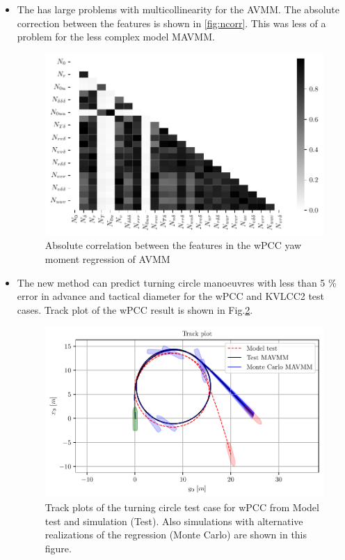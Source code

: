 \begin{itemize}
    \item The  has large problems with multicollinearity for the AVMM. The absolute correction between the features is shown in \autoref{fig:ncorr}. This was less of a problem for the less complex model MAVMM.
    \begin{figure}[h]
        \centering
        \includegraphics{kappa/images/9.pdf}
        \caption{Absolute correlation between the features in the wPCC yaw moment regression of AVMM}
        \label{fig:ncorr}
    \end{figure}
    
    \item The new method can predict turning circle manoeuvres with less than 5 \% error in advance and tactical diameter for the wPCC and KVLCC2 test cases. Track plot of the wPCC result is shown in Fig.\ref{fig:turning_circle_wpcc}.
    \begin{figure}[h]
    \centering
    \includegraphics{kappa/images/10.pdf}
    \caption{Track plots of the turning circle test case for wPCC from Model test and simulation (Test). Also simulations with alternative realizations of the regression (Monte Carlo) are shown in this figure.}
    \label{fig:turning_circle_wpcc}
    \end{figure}
    
\end{itemize}






